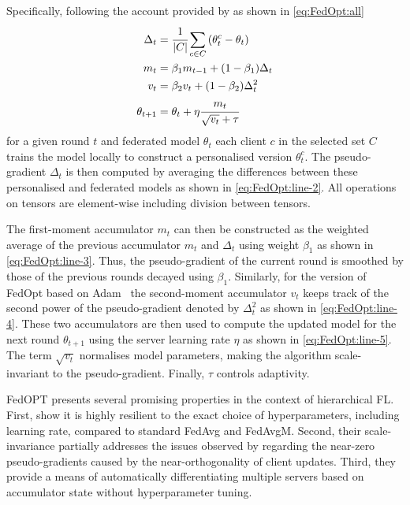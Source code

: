 Specifically, following the account provided by \citet{FedOPT} as shown in \cref{eq:FedOpt:all}
\begin{subequations}
    \begin{align}
        \Delta_t     & = \cfrac{1}{|C|} \sum_{c \in C} \left( \theta_t^c - \theta_t \right) \label{eq:FedOpt:line-2} \\
        m_t          & = \beta_1 m_{t-1} + (1-\beta_1) \Delta_t \label{eq:FedOpt:line-3}                             \\
        v_t          & = \beta_2 v_t + (1-\beta_2) \Delta_t^2 \label{eq:FedOpt:line-4}     \                         \\
        \theta_{t+1} & = \theta_t + \eta \cfrac{m_t}{\sqrt{v_t} + \tau} \label{eq:FedOpt:line-5}
    \end{align}
    \label{eq:FedOpt:all}
\end{subequations}
\noindent for a given round $t$ and federated model $\theta_t$  each client $c$ in the selected set $C$ trains the model locally to construct a personalised version $\theta_t^c$. The pseudo-gradient $\Delta_t$ is then computed by averaging the differences between these personalised and federated models as shown in \cref{eq:FedOpt:line-2}. All operations on tensors are element-wise including division between tensors.

The first-moment accumulator $m_t$ can then be constructed as the weighted average of the previous accumulator $m_t$ and $\Delta_t$ using weight $\beta_1$ as shown in \cref{eq:FedOpt:line-3}. Thus, the pseudo-gradient of the current round is smoothed by those of the previous rounds decayed using $\beta_1$. Similarly, for the version of FedOpt based on Adam~\citep{Adam} the second-moment accumulator $v_t$  keeps track of the second power of the pseudo-gradient denoted by $\Delta_t^2$ as shown in \cref{eq:FedOpt:line-4}. These two accumulators are then used to compute the updated model for the next round $\theta_{t+1}$ using the server learning rate $\eta$ as shown in \cref{eq:FedOpt:line-5}. The term $\sqrt{v_t}$ normalises model parameters, making the algorithm scale-invariant to the pseudo-gradient. Finally, $\tau$ controls adaptivity\@.

FedOPT presents several promising properties in the context of hierarchical FL\@. First, \citet{FedOPT} show it is highly resilient to the exact choice of hyperparameters, including learning rate, compared to standard FedAvg and FedAvgM. Second, their scale-invariance partially addresses the issues observed by \citet{LargeCohorts} regarding the near-zero pseudo-gradients caused by the near-orthogonality of client updates. Third, they provide a means of automatically differentiating multiple servers based on accumulator state without hyperparameter tuning.

